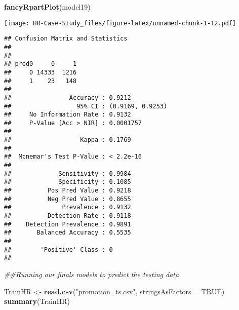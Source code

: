 \documentclass[
]{article}
\newenvironment{Shaded}{\begin{snugshade}}{\end{snugshade}}
\newcommand{\CommentTok}[1]{\textcolor[rgb]{0.56,0.35,0.01}{\textit{#1}}}
\newcommand{\DataTypeTok}[1]{\textcolor[rgb]{0.13,0.29,0.53}{#1}}
\newcommand{\KeywordTok}[1]{\textcolor[rgb]{0.13,0.29,0.53}{\textbf{#1}}}
\newcommand{\NormalTok}[1]{#1}
\newcommand{\OperatorTok}[1]{\textcolor[rgb]{0.81,0.36,0.00}{\textbf{#1}}}
\newcommand{\OtherTok}[1]{\textcolor[rgb]{0.56,0.35,0.01}{#1}}
\newcommand{\StringTok}[1]{\textcolor[rgb]{0.31,0.60,0.02}{#1}}
\begin{document}
\begin{Shaded}
\begin{Highlighting}[]
\KeywordTok{fancyRpartPlot}\NormalTok{(model19)}
\end{Highlighting}
\end{Shaded}

\texttt{[image: HR-Case-Study\_files/figure-latex/unnamed-chunk-1-12.pdf]}

\begin{Shaded}
\end{Shaded}

\begin{verbatim}
## Confusion Matrix and Statistics
## 
##      
## pred0     0     1
##     0 14333  1216
##     1    23   148
##                                           
##                Accuracy : 0.9212          
##                  95% CI : (0.9169, 0.9253)
##     No Information Rate : 0.9132          
##     P-Value [Acc > NIR] : 0.0001757       
##                                           
##                   Kappa : 0.1769          
##                                           
##  Mcnemar's Test P-Value : < 2.2e-16       
##                                           
##             Sensitivity : 0.9984          
##             Specificity : 0.1085          
##          Pos Pred Value : 0.9218          
##          Neg Pred Value : 0.8655          
##              Prevalence : 0.9132          
##          Detection Rate : 0.9118          
##    Detection Prevalence : 0.9891          
##       Balanced Accuracy : 0.5535          
##                                           
##        'Positive' Class : 0               
## 
\end{verbatim}

\begin{Shaded}
\begin{Highlighting}[]
\CommentTok{##Running our finals models to predict the testing data }

\NormalTok{TrainHR <-}\StringTok{ }\KeywordTok{read.csv}\NormalTok{(}\StringTok{"promotion_ts.csv"}\NormalTok{, }\DataTypeTok{stringsAsFactors =} \OtherTok{TRUE}\NormalTok{)}
\KeywordTok{summary}\NormalTok{(TrainHR)}
\end{Highlighting}
\end{Shaded}
\end{document}
